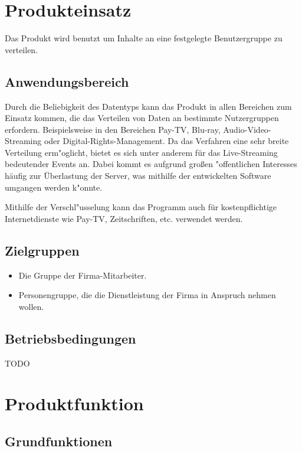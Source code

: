 \documentclass[a4paper,10pt]{scrartcl}
\begin{document}
\section{Produkteinsatz}

Das Produkt wird benutzt um Inhalte an eine festgelegte Benutzergruppe zu verteilen. 

\subsection{Anwendungsbereich}

Durch die Beliebigkeit des Datentyps kann das Produkt in allen Bereichen zum Einsatz kommen, die das Verteilen von Daten an
bestimmte Nutzergruppen erfordern. Beispielsweise in den Bereichen Pay-TV, Blu-ray, Audio-Video-Streaming oder Digital-Rights-Management.
Da das Verfahren eine sehr breite Verteilung erm"oglicht, bietet es sich unter anderem für das Live-Streaming bedeutender Events an.  
Dabei kommt es aufgrund großen "offentlichen Interesses häufig zur Überlastung der Server, was mithilfe der entwickelten Software umgangen werden k"onnte.  

Mithilfe der Verschl"usselung kann das Programm auch für kostenpflichtige Internetdienste wie Pay-TV, Zeitschriften,  etc. verwendet werden.  

\subsection{Zielgruppen}
\begin{itemize}
   \item Die Gruppe der Firma-Mitarbeiter.
   \item Personengruppe, die die Dienstleistung der Firma in Anspruch nehmen wollen.
\end{itemize}

\subsection{Betriebsbedingungen}
TODO

\section{Produktfunktion}

\subsection{Grundfunktionen}
\end{document}
